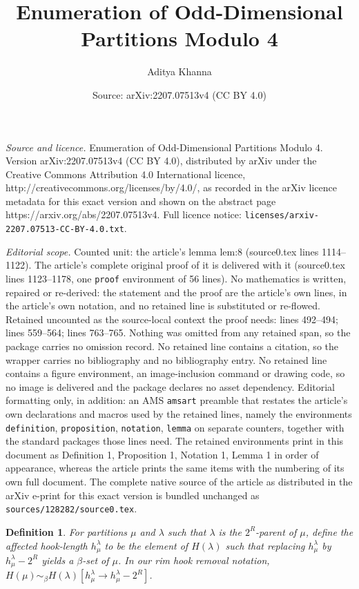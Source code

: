 \documentclass[10pt,a4paper]{amsart}
\title{Enumeration of Odd-Dimensional Partitions Modulo 4}
\author{Aditya Khanna}
\date{Source: arXiv:2207.07513v4 (CC BY 4.0)}
\newtheorem{definition}{Definition}
\newcommand{\la}{\lambda}
\begin{document}
\maketitle

\noindent\emph{Source and licence.} Enumeration of Odd-Dimensional Partitions Modulo 4. Version arXiv:2207.07513v4 (CC BY 4.0), distributed by arXiv under the Creative Commons Attribution 4.0 International licence, http://creativecommons.org/licenses/by/4.0/, as recorded in the arXiv licence metadata for this exact version and shown on the abstract page https://arxiv.org/abs/2207.07513v4. Full licence notice: \texttt{licenses/arxiv-2207.07513-CC-BY-4.0.txt}.\par\smallskip

\noindent\textit{Editorial scope.} Counted unit: the article's lemma lem:8 (source0.tex lines 1114--1122). The article's complete original proof of it is delivered with it (source0.tex lines 1123--1178, one \texttt{proof} environment of 56 lines). No mathematics is written, repaired or re-derived: the statement and the proof are the article's own lines, in the article's own notation, and no retained line is substituted or re-flowed.  Retained uncounted as the source-local context the proof needs: lines 492--494; lines 559--564; lines 763--765.  Nothing was omitted from any retained span, so the package carries no omission record.  No retained line contains a citation, so the wrapper carries no bibliography and no bibliography entry.  No retained line contains a figure environment, an image-inclusion command or drawing code, so no image is delivered and the package declares no asset dependency.  Editorial formatting only, in addition: an AMS \texttt{amsart} preamble that restates the article's own declarations and macros used by the retained lines, namely the environments \texttt{definition}, \texttt{proposition}, \texttt{notation}, \texttt{lemma} on separate counters, together with the standard packages those lines need.  The retained environments print in this document as Definition 1, Proposition 1, Notation 1, Lemma 1 in order of appearance, whereas the article prints the same items with the numbering of its own full document.  The complete native source of the article as distributed in the arXiv e-print for this exact version is bundled unchanged as \texttt{sources/128282/source0.tex}.
\begin{definition}\label{notn:aff}
For partitions $\mu$ and $\la$ such that $\la$ is the $2^R$-parent of $\mu$, define the \textit{affected hook-length} $h^\la_\mu$ to be the element of $H(\la)$ such that replacing $h^\la_\mu$ by $h^\la_\mu - 2^R$ yields a $\beta$-set of $\mu$. In our rim hook removal notation, $H(\mu) \sim_\beta H(\la)[h^\la_\mu \to h^\la_\mu - 2^R]$.
\end{definition}
\end{document}
